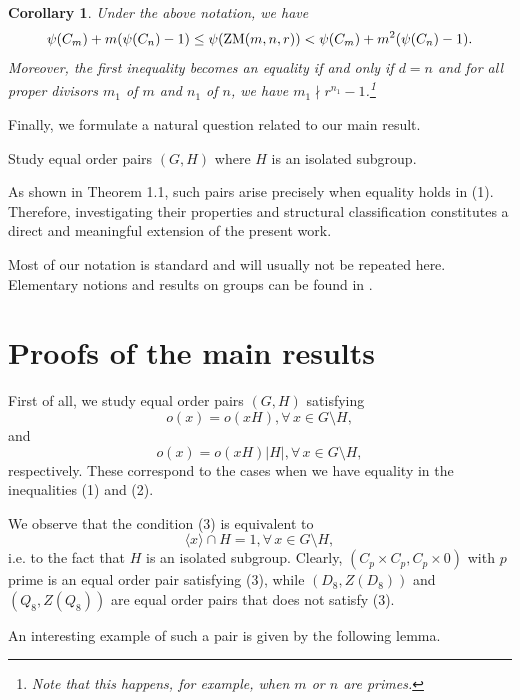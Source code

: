\documentclass[12pt]{article}
\newtheorem{corollary}[theorem]{Corollary}
\newcommand{\0}{{\leqno}}
\begin{document}
\begin{corollary}
Under the above notation, we have
\begin{equation}
\psi(C_m)+m(\psi(C_n)-1)\leq\psi({\rm ZM}(m,n,r))<\psi(C_m)+m^2(\psi(C_n)-1).\nonumber
\end{equation}Moreover, the first inequality becomes an equality if and only if $d=n$ and for all proper divisors $m_1$ of $m$ and $n_1$ of $n$, we have $m_1\nmid r^{n_1}-1$.\footnote{Note that this happens, for example, when $m$ or $n$ are primes.}
\end{corollary}

Finally, we formulate a natural question related to our main result.

\bigskip{} Study equal order pairs $(G,H)$ where $H$ is an isolated subgroup. 

As shown in Theorem 1.1, such pairs arise precisely when equality holds in (1). Therefore, investigating their properties and structural classification constitutes a direct and meaningful extension of the present work.
\bigskip

Most of our notation is standard and will usually not be repeated here. Elementary notions and results on groups can be found in \cite{18}.

\section{Proofs of the main results}

First of all, we study equal order pairs $(G,H)$ satisfying
\begin{equation}
o(x)=o(xH), \forall\, x\in G\setminus H,
\end{equation}and
\begin{equation}
o(x)=o(xH)|H|, \forall\, x\in G\setminus H,
\end{equation}respectively. These correspond to the cases when we have equality in the inequalities (1) and (2).

We observe that the condition (3) is equivalent to
\begin{equation}
\langle x\rangle\cap H=1, \forall\, x\in G\setminus H,\nonumber
\end{equation}i.e. to the fact that $H$ is an isolated subgroup. Clearly, $(C_p\times C_p,C_p\times 0)$ with $p$ prime is an equal order pair satisfying (3), while $(D_8,Z(D_8))$ and $(Q_8,Z(Q_8))$ are equal order pairs that does not satisfy (3).

An interesting example of such a pair is given by the following lemma. 
\end{document}

